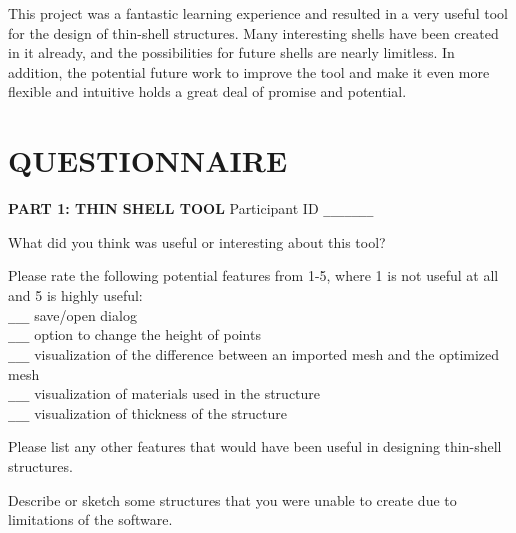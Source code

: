 \documentclass{thesis}
\begin{document}
This project was a fantastic learning experience and resulted in a very useful tool for the design of thin-shell structures.  Many
interesting shells have been created in it already, and the possibilities for future shells are nearly limitless.  In addition, the
potential future work to improve the tool and make it even more flexible and intuitive holds a great deal of promise and potential.


\begin{singlespace}


\end{singlespace}

\appendix    %
\chapter{QUESTIONNAIRE}
\setlength{\parindent}{0in} 
{\bf PART 1: THIN SHELL TOOL} 
\hfill Participant ID \verb+_______+
\vspace{0.3in}

What did you think was useful or interesting about this tool?
\vspace{1.1in}

Please rate the following potential features from 1-5, where 1 is not useful at all and 5 is highly useful: \\

\verb+___+ save/open dialog\\
\verb+___+ option to change the height of points\\
\verb+___+ visualization of the difference between an imported mesh and the optimized mesh\\
\verb+___+ visualization of materials used in the structure\\
\verb+___+ visualization of thickness of the structure


\vspace{0.3in}

Please list any other features that would have been useful in designing thin-shell structures.
\vspace{1.2in}




Describe or sketch some structures that you were unable to create due to limitations of the software.
\vspace{1in}
\end{document}

